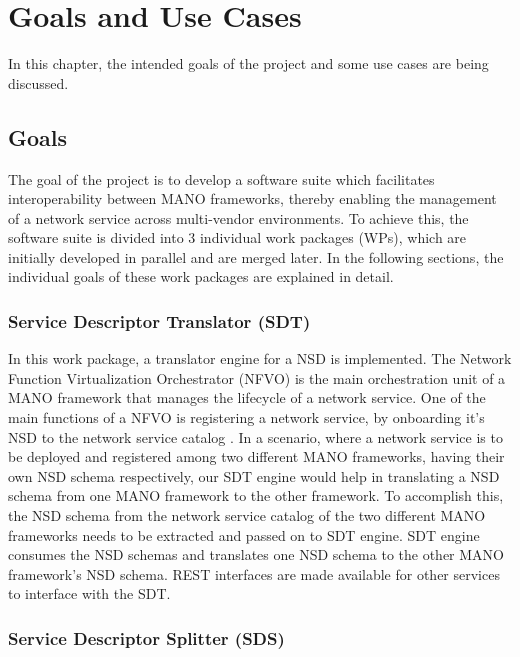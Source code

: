 \chapter{Goals and Use Cases}
\label{ch:Goals and Use Cases}

In this chapter, the intended goals of the project and some use cases are being discussed.

\section{Goals}

The goal of the project is to develop a software suite which facilitates interoperability between MANO frameworks, thereby enabling the management of a network service across multi-vendor environments. To achieve this, the software suite is divided into 3 individual work packages (WPs), which are initially developed in parallel and are merged later. In the following sections, the individual goals of these work packages are explained in detail.

\subsection{Service Descriptor Translator (SDT)}

In this work package, a translator engine for a NSD is implemented. The Network Function Virtualization Orchestrator (NFVO) is the main orchestration unit of a MANO framework that manages the lifecycle of a network service. One of the main functions of a NFVO is registering a network service, by onboarding it's NSD to the network service catalog . In a scenario, where a network service is to be deployed and registered among two different MANO
frameworks, having their own NSD schema respectively, our SDT engine would help in translating a NSD schema from one MANO framework to the other framework. To accomplish this, the NSD schema from the network service catalog of the two different MANO frameworks needs to be extracted and passed on to SDT engine. SDT engine consumes the NSD schemas and translates one NSD schema to the other MANO framework's NSD schema. REST interfaces are made available for other services to interface with the SDT.

\subsection{Service Descriptor Splitter (SDS)}

